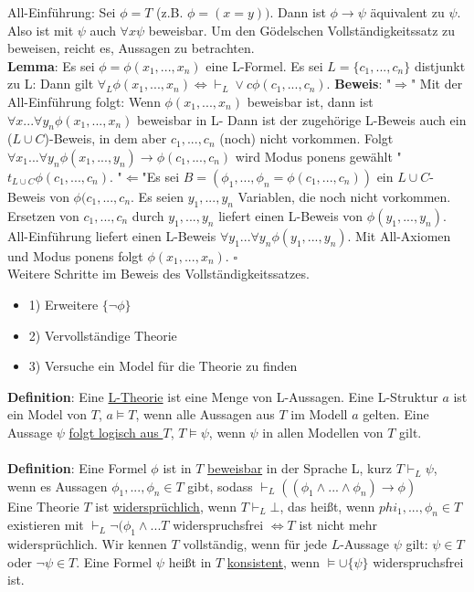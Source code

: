 \documentclass[a4paper]{scrartcl}
\begin{document}
All-Einführung: Sei $\phi = T$ (z.B. $\phi = (x = y))$. Dann ist $\phi \rightarrow \psi$ äquivalent zu $\psi$. Also ist mit $\psi$ auch $\forall x \psi$ beweisbar. Um den Gödelschen Vollständigkeitssatz zu beweisen, reicht es, Aussagen zu betrachten.\\
\textbf{Lemma}: Es sei $\phi = \phi (x_1, ..., x_n)$ eine L-Formel. Es sei $L = \{ c_1, ..., c_n \}$ distjunkt zu L: Dann gilt $\forall_L \phi (x_1, ..., x_n) \Leftrightarrow \vdash_L \vee c \phi (c_1, ..., c_n).$
\textbf{Beweis}: "$\Rightarrow$" Mit der All-Einführung folgt: Wenn $\phi (x_1, ..., x_n)$ beweisbar ist, dann ist $\forall x ... \forall y_n \phi (x_1, ..., x_n)$ beweisbar in L- Dann ist der zugehörige L-Beweis auch ein ($L \cup C$)-Beweis, in dem aber $c_1, ..., c_n$ (noch) nicht vorkommen. Folgt $\forall x_1 ... \forall y_n \phi (x_1, ..., y_n) \rightarrow \phi (c_1, ..., c_n)$ wird Modus ponens gewählt "$t_{L \cup C} \phi (c_1, ..., c_n)$.\newpage
"$\Leftarrow$"$ $Es sei $B = (\phi_1, ..., \phi_n = \phi (c_1, ..., c_n))$ ein $L \cup C$-Beweis von $\phi (c_1, ..., c_n$. Es seien $y_1, ..., y_n$ Variablen, die noch nicht vorkommen. Ersetzen von $c_1, ..., c_n$ durch $y_1, ..., y_n$ liefert einen L-Beweis von $\phi(y_1, ..., y_n)$. All-Einführung liefert einen L-Beweis $\forall y_1 ... \forall y_n \phi (y_1, ..., y_n)$. Mit All-Axiomen und Modus ponens folgt $\phi (x_1, ..., x_n)$. $ \square$\\
Weitere Schritte im  Beweis des Vollständigkeitssatzes.
\begin{itemize}
\item{1)} Erweitere $\{ \neg \phi \}$
\item{2)} Vervollständige Theorie
\item{3)} Versuche ein Model für die Theorie zu finden
\end{itemize}
\textbf{Definition}: Eine \underline{L-Theorie} ist eine Menge von L-Aussagen. Eine L-Struktur $a$ ist ein Model von $T$, $a \models T$, wenn alle Aussagen aus $T$ im Modell $a$ gelten. Eine Aussage $\psi$ \underline{folgt logisch aus $T$}, $T \models \psi$, wenn $\psi$ in allen Modellen von $T$ gilt.\\\\
\textbf{Definition}: Eine Formel $\phi$ ist in $T$ \underline{beweisbar} in der Sprache L, kurz $T \vdash_L \psi$, wenn es Aussagen $\phi_1, ..., \phi_n \in T$ gibt, sodass $\vdash_L ((\phi_1 \wedge ... \wedge \phi_n) \rightarrow \phi)$\\
Eine Theorie $T$ ist \underline{widersprüchlich}, wenn $T \vdash_L \bot$, das heißt, wenn $phi_1, ..., \phi_n \in T$ existieren mit $\vdash_L \neg (\phi_1 \wedge ... T$ widerspruchsfrei $\Leftrightarrow T$ ist nicht mehr widersprüchlich. Wir kennen $T$ vollständig, wenn für jede $L$-Aussage $\psi$ gilt: $\psi \in T$ oder $\neg \psi \in T$. Eine Formel $\psi$ heißt in $T$ \underline{konsistent}, wenn $\models \cup \{ \psi \}$ widerspruchsfrei ist.\\\\
\end{document}

